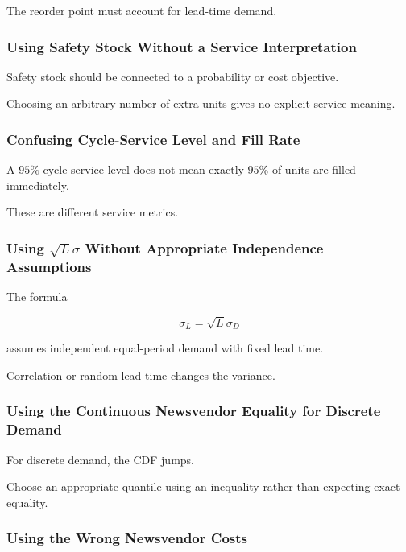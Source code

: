The reorder point must account for lead-time demand.

\subsubsection{Using Safety Stock Without a Service Interpretation}

Safety stock should be connected to a probability or cost objective.

Choosing an arbitrary number of extra units gives no explicit service
meaning.

\subsubsection{Confusing Cycle-Service Level and Fill Rate}

A \(95\%\) cycle-service level does not mean exactly \(95\%\) of units are
filled immediately.

These are different service metrics.

\subsubsection{Using \(\sqrt{L}\sigma\) Without Appropriate Independence Assumptions}

The formula

\[
\sigma_L
=
\sqrt{L}\sigma_D
\]

assumes independent equal-period demand with fixed lead time.

Correlation or random lead time changes the variance.

\subsubsection{Using the Continuous Newsvendor Equality for Discrete Demand}

For discrete demand, the CDF jumps.

Choose an appropriate quantile using an inequality rather than expecting
exact equality.

\subsubsection{Using the Wrong Newsvendor Costs}

